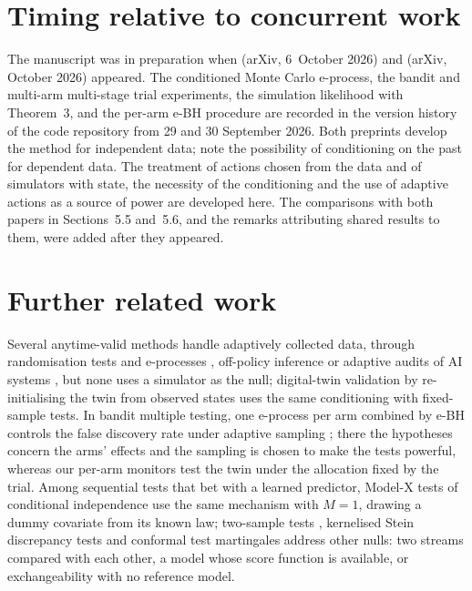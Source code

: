 \documentclass[11pt]{article}
\theoremstyle{remark}
\begin{document}
\section{Timing relative to concurrent work}\label{app:timeline}

The manuscript was in preparation when \citet{forre2026anytime} (arXiv,
6~October 2026) and \citet{cortinovis2026slice} (arXiv, October 2026)
appeared. The conditioned Monte Carlo e-process, the bandit and multi-arm
multi-stage trial experiments, the simulation likelihood with
Theorem~3, and the per-arm e-BH procedure are recorded in the
version history of the code repository from 29 and 30 September 2026. Both
preprints develop the method for independent data;
\citet[Appendix~C.1.1]{cortinovis2026slice} note the possibility of
conditioning on the past for dependent data. The treatment of actions chosen
from the data and of simulators with state, the necessity of the conditioning
and the use of adaptive actions as a source of power are developed here. The comparisons with both papers in
Sections~5.5 and~5.6, and the remarks
attributing shared results to them, were added after they appeared.

\section{Further related work}\label{app:related}

Several anytime-valid methods handle adaptively
collected data, through randomisation tests and e-processes
\citep{nair2023randomization,zampieri2025sequential}, off-policy inference
\citep{waudbysmith2024anytime} or adaptive audits of AI systems
\citep{zhou2026adaptive}, but none uses a simulator as the null; digital-twin
validation by re-initialising the twin from observed states
\citep{ghasemloo2026subtrace} uses the same conditioning with fixed-sample
tests. In bandit multiple testing, one e-process per arm combined by e-BH
controls the false discovery rate under adaptive sampling
\citep{xu2021unified}; there the hypotheses concern the arms' effects and the
sampling is chosen to make the tests powerful, whereas our per-arm monitors
test the twin under the allocation fixed by the trial. Among sequential tests
that bet with a learned predictor, Model-X tests of conditional independence
\citep{shaer2023modelx} use the same mechanism with $M = 1$, drawing a dummy
covariate from its known law; two-sample tests
\citep{podkopaev2023sequential,shekhar2023nonparametric}, kernelised Stein
discrepancy tests \citep{martinez2025sequential} and conformal test
martingales \citep{vovk2003testing,vovk2021testing,prinster2025watch} address
other nulls: two streams compared with each other, a model whose score
function is available, or exchangeability with no reference model.



\end{document}
